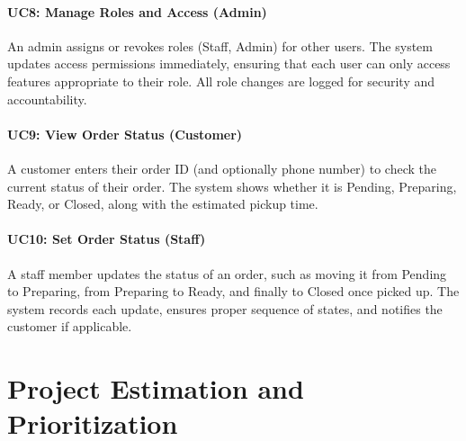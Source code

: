 \documentclass{article}
\begin{document}
\paragraph{UC8: Manage Roles and Access (Admin)}  
An admin assigns or revokes roles (Staff, Admin) for other users. The system updates access permissions immediately, ensuring that each user can only access features appropriate to their role. All role changes are logged for security and accountability.

\paragraph{UC9: View Order Status (Customer)}  
A customer enters their order ID (and optionally phone number) to check the current status of their order. The system shows whether it is Pending, Preparing, Ready, or Closed, along with the estimated pickup time.

\paragraph{UC10: Set Order Status (Staff)}  
A staff member updates the status of an order, such as moving it from Pending to Preparing, from Preparing to Ready, and finally to Closed once picked up. The system records each update, ensures proper sequence of states, and notifies the customer if applicable.


\section{Project Estimation and Prioritization}
\end{document}
